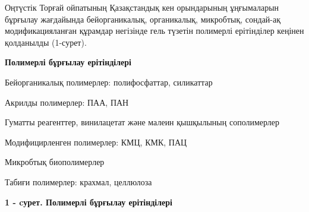 \begin{multicols}{2}
Оңтүстік Торғай ойпатының Қазақстандық кен орындарының ұңғымаларын
бұрғылау жағдайында бейорганикалық, органикалық, микробтық, сондай-ақ
модификацияланған құрамдар негізінде гель түзетін полимерлі ерітінділер
кеңінен қолданылды (1-сурет).

{\bfseries Полимерлі бұрғылау ерітінділері}

Бейорганикалық полимерлер: полифосфаттар, силикаттар

Акрилды полимерлер: ПАА, ПАН

Гуматты реагенттер, винилацетат және малеин қышқылының сополимерлер

Модифицирленген полимерлер: КМЦ, КМК, ПАЦ

Микробтық биополимерлер

Табиғи полимерлер: крахмал, целлюлоза
\end{multicols}

{\bfseries 1 - cурет. Полимерлі бұрғылау ерітінділері}

